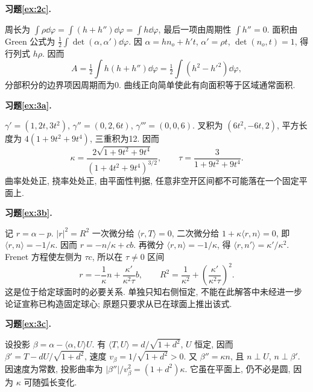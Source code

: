 \par{}
\noindent\textbf{习题\ref{ex:2c}.}
\begin{solution}
周长为 $\int\rho\dd\varphi=\int(h+h'')\dd\varphi=\int h\dd\varphi$, 最后一项由周期性 $\int h''=0$. 面积由 Green 公式为 $\frac12\int\det(\alpha,\alpha')\dd\varphi$. 因 $\alpha=hn_o+h't$, $\alpha'=\rho t$, $\det(n_o,t)=1$, 得行列式 $h\rho$. 因而
\[
 A=\tfrac12\int h(h+h'')\dd\varphi
 =\tfrac12\int(h^2-h'^2)\dd\varphi,
\]
分部积分的边界项因周期而为0. 曲线正向简单使此有向面积等于区域通常面积.
\end{solution}
\par{}
\par{}
\noindent\textbf{习题\ref{ex:3a}.}
\begin{solution}
$\gamma'=(1,2t,3t^2)$, $\gamma''=(0,2,6t)$, $\gamma'''=(0,0,6)$. 叉积为 $(6t^2,-6t,2)$, 平方长度为 $4(1+9t^2+9t^4)$, 三重积为12. 因而
\[
 \kappa=\frac{2\sqrt{1+9t^2+9t^4}}{(1+4t^2+9t^4)^{3/2}},\qquad
 \tau=\frac3{1+9t^2+9t^4}.
\]
曲率处处正, 挠率处处正, 由平面性判据, 任意非空开区间都不可能落在一个固定平面上.
\end{solution}
\par{}
\noindent\textbf{习题\ref{ex:3b}.}
\begin{solution}
记 $r=\alpha-p$. $|r|^2=R^2$ 一次微分给 $\langle r,T\rangle=0$, 二次微分给 $1+\kappa\langle r,n\rangle=0$, 即 $\langle r,n\rangle=-1/\kappa$. 因而 $r=-n/\kappa+cb$. 再微分 $\langle r,n\rangle=-1/\kappa$, 得 $\langle r,n'\rangle=\kappa'/\kappa^2$. Frenet 方程使左侧为 $\tau c$, 所以在 $\tau\ne0$ 区间
\[
 r=-\frac1\kappa n+\frac{\kappa'}{\kappa^2\tau}b,\qquad
 R^2=\frac1{\kappa^2}+\left(\frac{\kappa'}{\kappa^2\tau}\right)^2.
\]
这是位于给定球面时的必要关系. 单独只知右侧恒定, 不能在此解答中未经进一步论证宣称已构造固定球心; 原题只要求从已在球面上推出该式.
\end{solution}
\par{}
\noindent\textbf{习题\ref{ex:3c}.}
\begin{solution}
设投影 $\beta=\alpha-\langle\alpha,U\rangle U$. 有 $\langle T,U\rangle=d/\sqrt{1+d^2}$, $U$ 恒定, 因而 $\beta'=T-dU/\sqrt{1+d^2}$, 速度 $v_\beta=1/\sqrt{1+d^2}>0$. 又 $\beta''=\kappa n$, 且 $n\perp U$, $n\perp\beta'$. 因速度为常数, 投影曲率为 $|\beta''|/v_\beta^2=(1+d^2)\kappa$. 它虽在平面上, 仍不必是圆, 因为 $\kappa$ 可随弧长变化.
\end{solution}
\par{}
